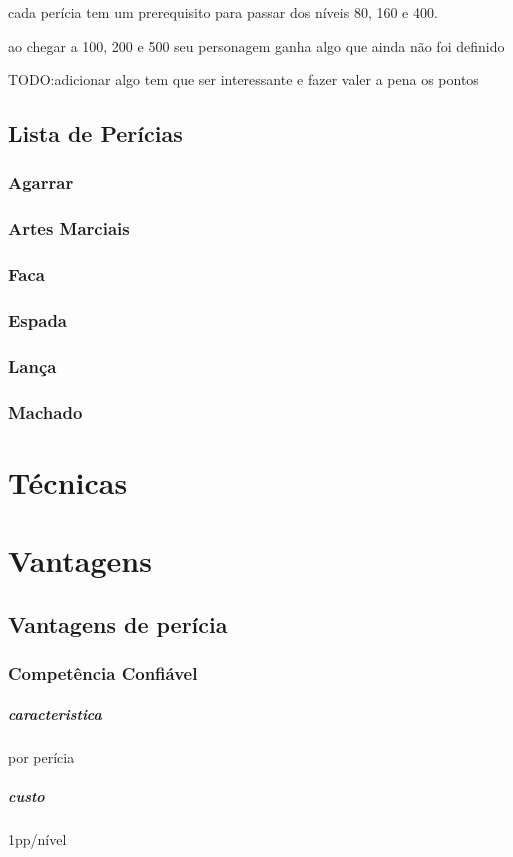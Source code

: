 cada perícia tem um prerequisito para passar dos níveis 80, 160 e 400.


ao chegar a 100, 200 e 500 seu personagem ganha algo que ainda não foi definido


TODO:adicionar algo tem que ser interessante e fazer valer a pena os pontos
%
%
\section{Lista de Perícias}
\subsection{Agarrar}
\subsection{Artes Marciais}
\subsection{Faca}
\subsection{Espada}
\subsection{Lança}
\subsection{Machado}
\chapter{Técnicas}
%
%
%
%
%
\chapter{Vantagens}
%
%
\section{Vantagens de perícia}
%
%
\subsection{Competência Confiável}
\paragraph{caracteristica} por perícia
\paragraph{custo} 1pp/nível

